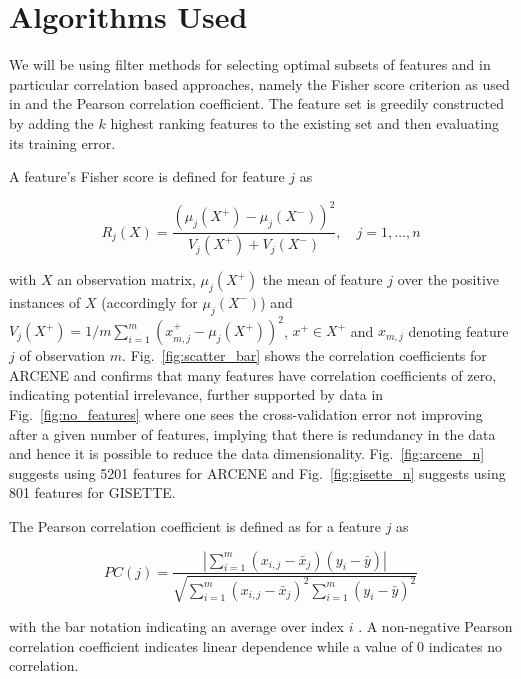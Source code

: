 \documentclass[12pt,a4paper,twocolumn]{article}
\begin{document}
\section{Algorithms Used}

We will be using filter methods for selecting optimal subsets of features and in particular correlation based approaches, namely the Fisher score criterion as used in  \cite{filter_svms} and the Pearson correlation coefficient. The feature set is greedily constructed by adding the $k$ highest ranking features to the existing set and then evaluating its training error.

A feature's Fisher score is defined for feature $j$ as

\begin{equation}
 R_j(X) = \frac{(\mu_j(X^+) - \mu_j(X^-))^2}{V_j(X^+)+ V_j(X^-)}  , \quad  j=1,\dots ,n
 \label{fisher_score}
\end{equation}

with $X$ an observation matrix, $\mu_j(X^+)$ the mean of feature $j$ over the positive instances of $X$ (accordingly for $\mu_j(X^-)$) and $V_j(X^+)  = 1/m \sum_{i=1}^m (x_{m,j}^+ - \mu_j(X^+) )^2 $, $x^+ \in X^+$ and $x_{m,j}$ denoting feature $j$ of observation $m$. Fig.~\ref{fig:scatter_bar} shows the correlation coefficients for ARCENE and confirms that many features have correlation coefficients of zero, indicating potential irrelevance, further supported by data in Fig.~\ref{fig:no_features} where one sees the cross-validation error not improving after a given number of features, implying that there is redundancy in the data and hence it is possible to reduce the data dimensionality. Fig.~\ref{fig:arcene_n} suggests using 5201 features for ARCENE and Fig.~\ref{fig:gisette_n} suggests using 801 features for GISETTE.

The Pearson correlation coefficient is defined as for a feature $j$ as

\begin{equation}
PC(j) = \frac{|\sum_{i=1}^m (x_{i,j} - \bar{x}_j)(y_i-\bar{y})|}{\sqrt{\sum_{i=1}^m(x_{i,j}-\bar{x}_j)^2\sum_{i=1}^m(y_i-\bar{y})^2}}
\label{eq:pearson}
\end{equation}

with the bar notation indicating an average over index $i$ \citep{feature_selection_intro}. A non-negative Pearson correlation coefficient indicates linear dependence while a value of 0 indicates no correlation\citep{filter_methods}.
\end{document}
